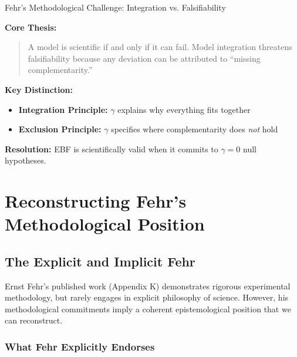 \begin{chapter}{Fehr's Methodological Challenge: Integration vs. Falsifiability}
\begin{tcolorbox}[colback=yellow!5!white,colframe=yellow!75!black,title=\textbf{Quick Reference: The Fehr Position}]
\small
\textbf{Core Thesis:}
\begin{quote}
A model is scientific if and only if it can fail. Model integration threatens falsifiability because any deviation can be attributed to ``missing complementarity.''
\end{quote}

\textbf{Key Distinction:}
\begin{itemize}[noitemsep]
    \item \textbf{Integration Principle:} $\gamma$ explains why everything fits together
    \item \textbf{Exclusion Principle:} $\gamma$ specifies where complementarity does \textit{not} hold
\end{itemize}

\textbf{Resolution:} EBF is scientifically valid when it commits to $\gamma = 0$ null hypotheses.
\end{tcolorbox}


\section{Reconstructing Fehr's Methodological Position}
\label{sec:fehr-position}

\subsection{The Explicit and Implicit Fehr}

Ernst Fehr's published work (Appendix K) demonstrates rigorous experimental methodology, but rarely engages in explicit philosophy of science. However, his methodological commitments imply a coherent epistemological position that we can reconstruct.

\subsubsection{What Fehr Explicitly Endorses}


\end{chapter}
